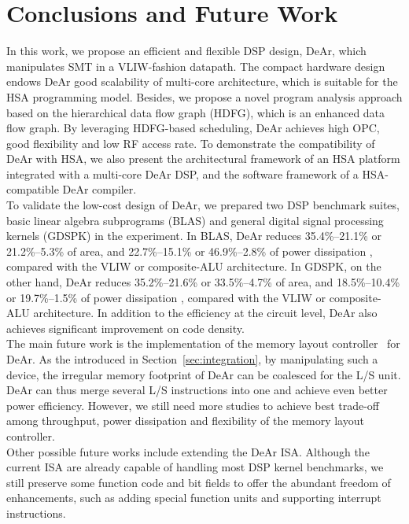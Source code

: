 \chapter{Conclusions and Future Work}
In this work, we propose an efficient and flexible DSP design, DeAr,
which manipulates SMT in a VLIW-fashion datapath.
The compact hardware design endows DeAr good scalability of multi-core architecture, 
which is suitable for the HSA programming model.
Besides, we propose a novel program analysis approach based on the hierarchical data flow graph (HDFG), which is an enhanced data flow graph.
By leveraging HDFG-based scheduling, DeAr achieves high OPC, good flexibility and low RF access rate.
To demonstrate the compatibility of DeAr with HSA,
we also present the architectural framework of an HSA platform integrated with a multi-core DeAr DSP, 
and the software framework of a HSA-compatible DeAr compiler.
\\\indent
To validate the low-cost design of DeAr, we prepared two DSP benchmark suites, basic linear algebra subprograms (BLAS) and general digital signal processing kernels (GDSPK) in the experiment.
In BLAS, DeAr reduces 35.4\%--21.1\% or 21.2\%--5.3\% of area,
and 22.7\%--15.1\% or 46.9\%--2.8\% of power dissipation , compared with the VLIW or composite-ALU architecture.
In GDSPK, on the other hand, DeAr reduces 35.2\%--21.6\% or 33.5\%--4.7\% of area, 
and 18.5\%--10.4\% or 19.7\%--1.5\% of power dissipation , compared with the VLIW or composite-ALU architecture.
In addition to the efficiency at the circuit level, DeAr also achieves significant improvement on code density.
\\\indent
The main future work is the implementation of the memory layout controller~\cite{sc} for DeAr.
As the introduced in Section~\ref{sec:integration}, by manipulating such a device, the irregular memory footprint of DeAr can be coalesced for the L/S unit.
DeAr can thus merge several L/S instructions into one and achieve even better power efficiency.
However, we still need more studies to achieve best trade-off among throughput, power dissipation and flexibility of the memory layout controller.
\\\indent
Other possible future works include extending the DeAr ISA.
Although the current ISA are already capable of handling most DSP kernel benchmarks, 
we still preserve some function code and bit fields to offer the abundant freedom of enhancements, 
such as adding special function units and supporting interrupt instructions.
